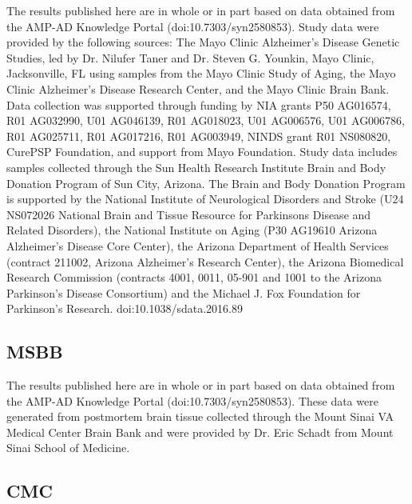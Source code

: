 {The results published here are in whole or in part based on data obtained from the AMP-AD Knowledge Portal (doi:10.7303/syn2580853). Study data were provided by the following sources: The Mayo Clinic Alzheimer’s Disease Genetic Studies, led by Dr. Nilufer Taner and Dr. Steven G. Younkin, Mayo Clinic, Jacksonville, FL using samples from the Mayo Clinic Study of Aging, the Mayo Clinic Alzheimer’s Disease Research Center, and the Mayo Clinic Brain Bank. Data collection was supported through funding by NIA grants P50 AG016574, R01 AG032990, U01 AG046139, R01 AG018023, U01 AG006576, U01 AG006786, R01 AG025711, R01 AG017216, R01 AG003949, NINDS grant R01 NS080820, CurePSP Foundation, and support from Mayo Foundation. Study data includes samples collected through the Sun Health Research Institute Brain and Body Donation Program of Sun City, Arizona. The Brain and Body Donation Program is supported by the National Institute of Neurological Disorders and Stroke (U24 NS072026 National Brain and Tissue Resource for Parkinsons Disease and Related Disorders), the National Institute on Aging (P30 AG19610 Arizona Alzheimer’s Disease Core Center), the Arizona Department of Health Services (contract 211002, Arizona Alzheimer’s Research Center), the Arizona Biomedical Research Commission (contracts 4001, 0011, 05-901 and 1001 to the Arizona Parkinson's Disease Consortium) and the Michael J. Fox Foundation for Parkinson’s Research.  doi:10.1038/sdata.2016.89 


\subsection{MSBB}
The results published here are in whole or in part based on data obtained from the AMP-AD Knowledge Portal (doi:10.7303/syn2580853). These data were generated from postmortem brain tissue collected through the Mount Sinai VA Medical Center Brain Bank and were provided by Dr. Eric Schadt from Mount Sinai School of Medicine. 

\subsection{CMC}

}
